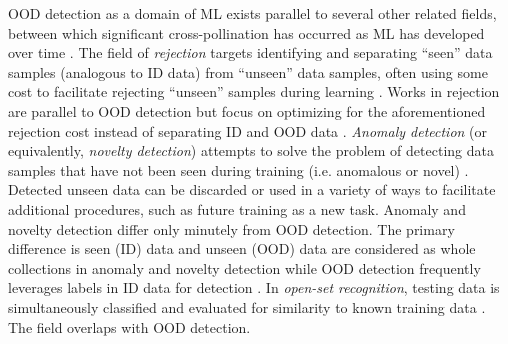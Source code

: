 OOD detection as a domain of ML exists parallel to several other related fields, between which significant cross-pollination has occurred as ML has developed over time \cite{ghassemi2022comprehensive,cui2022out,shen2021towards}. The field of \textit{rejection} targets identifying and separating ``seen'' data samples (analogous to ID data) from ``unseen'' data samples, often using some cost to facilitate rejecting ``unseen'' samples during learning \cite{cortes2016learning,geifman2017selective}. Works in rejection are parallel to OOD detection but focus on optimizing for the aforementioned rejection cost instead of separating ID and OOD data \cite{cortes2016learning}. \textit{Anomaly detection} (or equivalently, \textit{novelty detection}) attempts to solve the problem of detecting data samples that have not been seen during training (i.e. anomalous or novel) \cite{tax2002one,liu2008isolation,andrews2016transfer}. Detected unseen data can be discarded or used in a variety of ways to facilitate additional procedures, such as future training as a new task. Anomaly and novelty detection differ only minutely from OOD detection. The primary difference is seen (ID) data and unseen (OOD) data are considered as whole collections in anomaly and novelty detection while OOD detection frequently leverages labels in ID data for detection \cite{yang2021generalized,yang2022openood}. In \textit{open-set recognition}, testing data is simultaneously classified and evaluated for similarity to known training data \cite{scheirer2012toward,bendale2015towards,ge2017generative,neal2018open}. The field overlaps with OOD detection.

